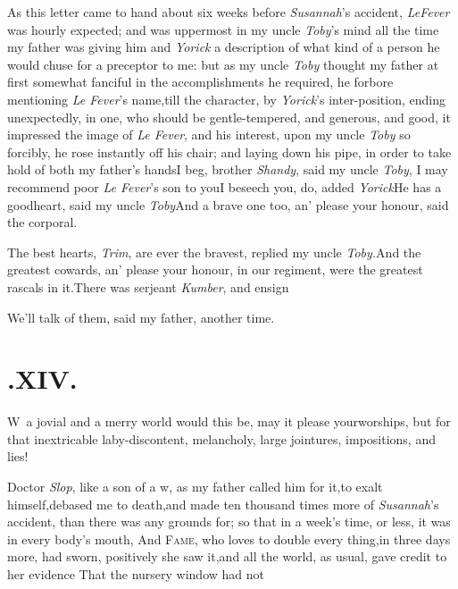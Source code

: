 \documentclass{article}
\begin{document}
As this letter came to hand about six weeks before
\textit{Susannah}’s accident, \textit{Le\pb Fever} was hourly
expected; and was uppermost in my uncle \textit{Toby}’s mind
all the time my father was giving him and \textit{Yorick} a
description of what kind of a person he would chuse for a preceptor
to me: but as my uncle \textit{Toby} thought my father at first somewhat fanciful in the
accomplishments he required, he forbore mentioning \textit{Le
Fever}’s name,\tsh till the character, by
\textit{Yorick}’s inter-position, ending unexpectedly, in one,
who should be gentle-tempered, and generous, and good, it impressed
the image of \textit{Le Fever}, and his interest, upon my uncle
\textit{Toby} so forcibly, he rose instantly off his chair; and
laying down his pipe, in order to take hold of both my
father’s hands\tsh I beg, brother \textit{Shandy},
said my uncle \textit{Toby}, I may recommend poor \textit{Le
Fever}’s son to you\tsk I beseech you, do, added
\textit{Yorick}\tsh He has a good\pb heart, said my uncle
\textit{Toby}\tsh And a brave one too, an’ please your
honour, said the corporal.

\tsh The best hearts, \textit{Trim}, are ever the
bravest, replied my uncle \textit{Toby.}\tsh And the
greatest cowards, an’ please your honour, in our regiment,
were the greatest rascals in it.\tsk There was serjeant
\textit{Kumber}, and ensign\tsh

\tsh We’ll talk of them, said my father, another
time.

\smallskip

\section{.\enspace XIV.}

\lettrine{W}{\,} a jovial and a merry world would
this be, may it please your\break worships, but for that inextricable
laby-\break{}\pb discontent,
melancholy, large jointures, impositions, and lies!

Doctor \textit{Slop}, like a son of a w\tsk, as\break
my father called him for it,\tsk to exalt\break
himself,\tsk debased me to death,\tsk and\break
made ten thousand times more of
\textit{Susannah}’s accident, than there was any grounds for;
so that in a week’s time, or less, it was in every
body’s mouth,\break
{}
\break
And \textsc{Fame}, who loves to
double every thing,\tsk in three days more, had sworn, positively
she saw it,\tsk and all the world, as usual, gave credit to her
evidence\tsh\break
\lqq That the nursery window had not\break
{}
\stick{\astfill}
\stick{\astfill}
\end{document}

